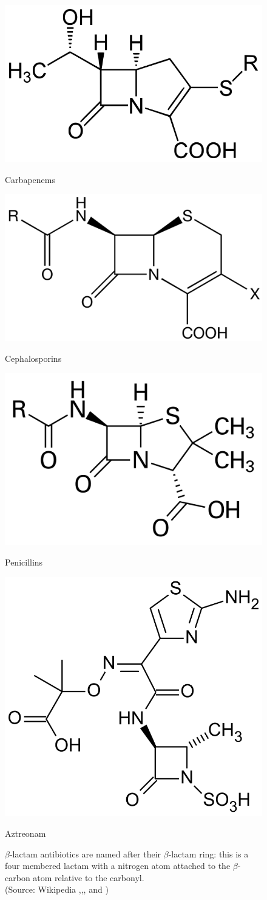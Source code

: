 \documentclass[11pt]{report}
\begin{document}
\clearpage
\begin{figure}[ht]
\label{beta_lactam} 
  \noindent\begin{minipage}[b]{0.5\linewidth}
    \includegraphics[width=.5\linewidth]{img/carbapenem.png} 
    \caption*{Carbapenems} 
  \end{minipage}%
  \noindent\begin{minipage}[b]{0.5\linewidth}
    \includegraphics[width=.5\linewidth]{img/cephalosporin.png} 
    \caption*{Cephalosporins} 
  \end{minipage}
  \noindent\begin{minipage}[b]{0.5\linewidth}
    \includegraphics[width=.5\linewidth]{img/penicillin.png} 
    \caption*{Penicillins}
  \end{minipage}%
  \hfill
  \noindent\begin{minipage}[b]{0.5\linewidth}
    \includegraphics[width=.5\linewidth]{img/aztreonam.png} 
    \caption*{Aztreonam} 
  \end{minipage}%
  \caption{$\beta$-lactam antibiotics are named after their $\beta$-lactam ring: this is a four membered lactam with a nitrogen atom attached to the $\beta$-carbon atom relative to the carbonyl.\\
(Source: Wikipedia \cite{penicillin},\cite{cephalosporin},\cite{carbapenem}, and \cite{aztreonam})}
 \label{beta_lact}
\end{figure}
\end{document}
